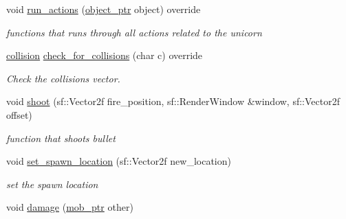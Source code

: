 \begin{DoxyCompactItemize}
void \hyperlink{classunicorn_aadb47a9981c46d6add8704074df117df}{run\+\_\+actions} (\hyperlink{drawable_8hpp_aab5add95f06d2ba25dbfed8eb07274fa}{object\+\_\+ptr} object) override
\begin{DoxyCompactList}\small\item\em functions that runs through all actions related to the unicorn \end{DoxyCompactList}\item 
\hyperlink{structcollision}{collision} \hyperlink{classunicorn_a40fe782f273abf46f6121db9aa4bf77a}{check\+\_\+for\+\_\+collisions} (char c) override
\begin{DoxyCompactList}\small\item\em Check the collisions vector. \end{DoxyCompactList}\item 
void \hyperlink{classunicorn_af448a3fa5fc5f09254b50afa151ce42b}{shoot} (sf\+::\+Vector2f fire\+\_\+position, sf\+::\+Render\+Window \&window, sf\+::\+Vector2f offset)
\begin{DoxyCompactList}\small\item\em function that shoots bullet \end{DoxyCompactList}\item 
void \hyperlink{classunicorn_af0e2581c426b4b1e32f8a7b484b4e242}{set\+\_\+spawn\+\_\+location} (sf\+::\+Vector2f new\+\_\+location)
\begin{DoxyCompactList}\small\item\em set the spawn location \end{DoxyCompactList}\item 
void \hyperlink{classunicorn_a8b5a22ab1b26daa540ceb09b5b5747d8}{damage} (\hyperlink{npc_8hpp_a09ee7f853fc9bc830a9445a06fd53d4b}{mob\+\_\+ptr} other)
\end{DoxyCompactItemize}
